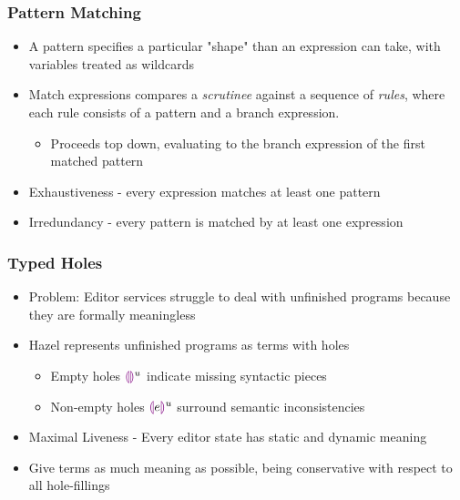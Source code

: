 \documentclass{beamer}
\begin{document}
\begin{frame}
\frametitle{Pattern Matching}
\begin{itemize}
\item A pattern specifies a particular "shape" than an expression can take, with variables treated as wildcards
\medskip
\item Match expressions compares a \emph{scrutinee} against a sequence of \emph{rules}, where each rule consists of a pattern and a branch expression.
\medskip
\begin{itemize}
\item Proceeds top down, evaluating to the branch expression of the first matched pattern
\end{itemize}
\medskip
\item Exhaustiveness - every expression matches at least one pattern
\medskip
\item Irredundancy - every pattern is matched by at least one expression
\end{itemize}
\end{frame}
\begin{frame}
	\frametitle{Typed Holes}
	\begin{itemize}
	\item Problem: Editor services struggle to deal with unfinished programs because they are formally meaningless
	\medskip
	\item Hazel represents unfinished programs as terms with holes 
	\medskip
		\begin{itemize}
			\item Empty holes $\textcolor{violet}{\llparenthesis}\textcolor{violet}{\rrparenthesis}^{u}$ indicate missing syntactic pieces 
			\medskip
			\item Non-empty holes $\textcolor{violet}{\llparenthesis} e\textcolor{violet}{\rrparenthesis}^{u}$ surround semantic inconsistencies 
		\end{itemize}
	\medskip
	\item Maximal Liveness - Every editor state has static and dynamic meaning
	\medskip
	\item Give terms as much meaning as possible, being conservative with respect to all hole-fillings
	\end{itemize}
\end{frame}
\end{document}
